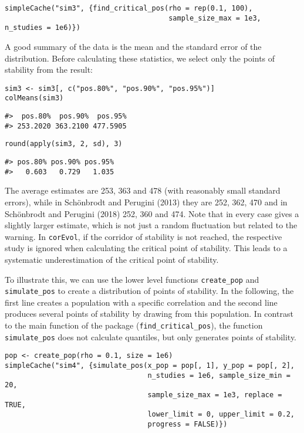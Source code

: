 \begin{verbatim}
simpleCache("sim3", {find_critical_pos(rho = rep(0.1, 100),
                                       sample_size_max = 1e3, n_studies = 1e6)})
\end{verbatim}

A good summary of the data is the mean and the standard error of the distribution. Before calculating these statistics, we select only the points of stability from the result:

\begin{verbatim}
sim3 <- sim3[, c("pos.80%", "pos.90%", "pos.95%")]
colMeans(sim3)
\end{verbatim}

\begin{verbatim}
#>  pos.80%  pos.90%  pos.95% 
#> 253.2020 363.2100 477.5905
\end{verbatim}

\begin{verbatim}
round(apply(sim3, 2, sd), 3)
\end{verbatim}

\begin{verbatim}
#> pos.80% pos.90% pos.95% 
#>   0.603   0.729   1.035
\end{verbatim}

The average estimates are 253, 363 and 478 (with reasonably small standard errors), while in Schönbrodt and Perugini (2013) they are 252, 362, 470 and in Schönbrodt and Perugini (2018) 252, 360 and 474. Note that in every case  gives a slightly larger estimate, which is not just a random fluctuation but related to the warning. In \texttt{corEvol}, if the corridor of stability is not reached, the respective study is ignored when calculating the critical point of stability. This leads to a systematic underestimation of the critical point of stability.

To illustrate this, we can use the lower level functions \texttt{create\_pop} and \texttt{simulate\_pos} to create a distribution of points of stability. In the following, the first line creates a population with a specific correlation and the second line produces several points of stability by drawing from this population. In contrast to the main function of the package (\texttt{find\_critical\_pos}), the function \texttt{simulate\_pos} does not calculate quantiles, but only generates points of stability.

\begin{verbatim}
pop <- create_pop(rho = 0.1, size = 1e6)
simpleCache("sim4", {simulate_pos(x_pop = pop[, 1], y_pop = pop[, 2],
                                  n_studies = 1e6, sample_size_min = 20,
                                  sample_size_max = 1e3, replace = TRUE,
                                  lower_limit = 0, upper_limit = 0.2,
                                  progress = FALSE)})
\end{verbatim}

